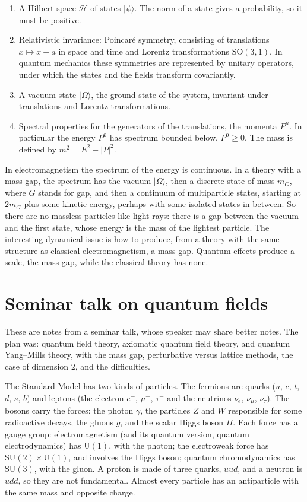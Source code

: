 \begin{enumerate}
\item A Hilbert space $\mathcal{H}$ of states
$|\psi\rangle$. The norm of a state gives a
probability, so it must be positive.
\item Relativistic invariance: Poincar\'e
symmetry, consisting of translations
$x\mapsto x+a$ in space and time and Lorentz
transformations $\mathrm{SO}(3,1)$. In
quantum mechanics these symmetries are
represented by unitary operators, under which
the states and the fields transform
covariantly.
\item A vacuum state $|\Omega\rangle$, the
ground state of the system, invariant under
translations and Lorentz transformations.
\item Spectral properties for the generators
of the translations, the momenta $P^\mu$. In
particular the energy $P^0$ has spectrum
bounded below, $P^0\geq 0$. The mass is
defined by $m^2=E^2-|P|^2$.
\end{enumerate}

In electromagnetism the spectrum of the
energy is continuous. In a theory with a mass
gap, the spectrum has the vacuum
$|\Omega\rangle$, then a discrete state of
mass $m_G$, where $G$ stands for gap, and
then a continuum of multiparticle states,
starting at $2m_G$ plus some kinetic energy,
perhaps with some isolated states in between.
So there are no massless particles like light
rays: there is a gap between the vacuum and
the first state, whose energy is the mass of
the lightest particle. The interesting
dynamical issue is how to produce, from a
theory with the same structure as classical
electromagnetism, a mass gap. Quantum effects
produce a scale, the mass gap, while the
classical theory has none.

\section{Seminar talk on quantum fields}

These are notes from a seminar talk, whose
speaker may share better notes. The plan was:
quantum field theory, axiomatic quantum field
theory, and quantum Yang--Mills theory, with
the mass gap, perturbative versus lattice
methods, the case of dimension $2$, and the
difficulties.

The Standard Model has two kinds of
particles. The fermions are quarks ($u$, $c$,
$t$, $d$, $s$, $b$) and leptons (the electron
$e^-$, $\mu^-$, $\tau^-$ and the neutrinos
$\nu_e$, $\nu_\mu$, $\nu_\tau$). The bosons
carry the forces: the photon $\gamma$, the
particles $Z$ and $W$ responsible for some
radioactive decays, the gluons $g$, and the
scalar Higgs boson $H$. Each force has a
gauge group: electromagnetism (and its
quantum version, quantum electrodynamics) has
$\mathrm{U}(1)$, with the photon; the
electroweak force has
$\mathrm{SU}(2)\times\mathrm{U}(1)$, and
involves the Higgs boson; quantum
chromodynamics has $\mathrm{SU}(3)$, with the
gluon. A proton is made of three quarks,
$uud$, and a neutron is $udd$, so they are
not fundamental. Almost every particle has an
antiparticle with the same mass and opposite
charge.

